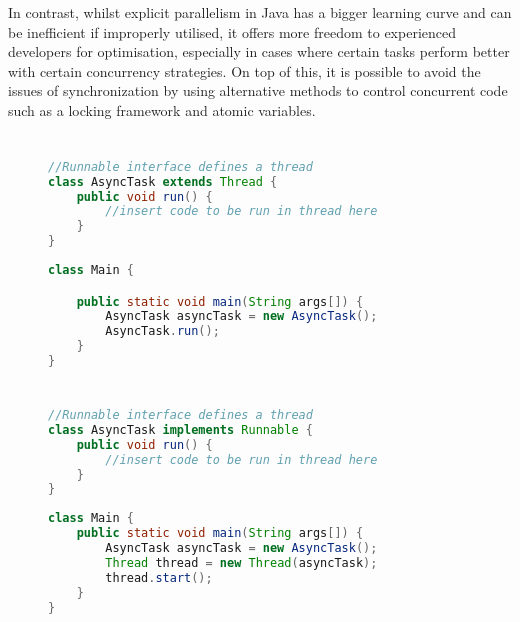 \documentclass[]{report}
\begin{document}
In contrast, whilst explicit parallelism in Java has a bigger learning curve and can be inefficient if improperly utilised, it offers more freedom to experienced developers for optimisation, especially in cases where certain tasks perform better with certain concurrency strategies. On top of this, it is possible to avoid the issues of synchronization by using alternative methods to control concurrent code such as a locking framework and atomic variables.

\appendix

\chapter{}
\begin{figure}[h!]
\caption{}
\begin{lstlisting}[language=Java,frame=single]
//Runnable interface defines a thread
class AsyncTask extends Thread {
	public void run() {
		//insert code to be run in thread here
	}
}
\end{lstlisting}
\end{figure}
\begin{figure}[h!]
\caption{}
\begin{lstlisting}[language=Java,frame=single]
class Main {

	public static void main(String args[]) { 
		AsyncTask asyncTask = new AsyncTask();
		AsyncTask.run();
	}
}
\end{lstlisting}
\end{figure}

\chapter{}
\begin{figure}[h!]
\caption{}
\begin{lstlisting}[language=Java,frame=single]
//Runnable interface defines a thread
class AsyncTask implements Runnable {
	public void run() {
		//insert code to be run in thread here
	}
}	
\end{lstlisting}
\end{figure}
\begin{figure}[h!]
\caption{}
\begin{lstlisting}[language=Java,frame=single]
class Main {
	public static void main(String args[]) { 
		AsyncTask asyncTask = new AsyncTask();
		Thread thread = new Thread(asyncTask);
		thread.start();
	}
}
\end{lstlisting}
\end{figure}
\end{document}
